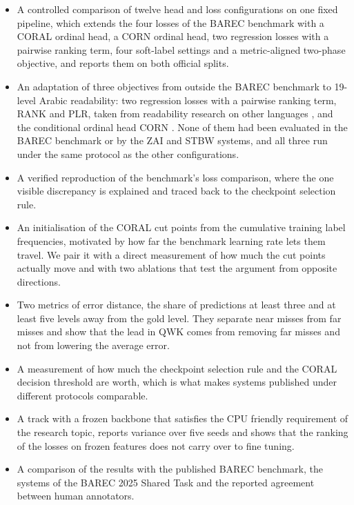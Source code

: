 \begin{itemize}

\item A controlled comparison of twelve head and loss configurations on one fixed pipeline, which extends the four losses of the BAREC benchmark with a CORAL ordinal head, a CORN ordinal head, two regression losses with a pairwise ranking term, four soft-label settings and a metric-aligned two-phase objective, and reports them on both official splits.

\item An adaptation of three objectives from outside the BAREC benchmark to 19-level Arabic readability: two regression losses with a pairwise ranking term, RANK and PLR, taken from readability research on other languages \cite{trokhymovych2024open,lee2022neural}, and the conditional ordinal head CORN \cite{shi2023deep}. None of them had been evaluated in the BAREC benchmark or by the ZAI and STBW systems, and all three run under the same protocol as the other configurations.

\item A verified reproduction of the benchmark's loss comparison, where the one visible discrepancy is explained and traced back to the checkpoint selection rule.

\item An initialisation of the CORAL cut points from the cumulative training label frequencies, motivated by how far the benchmark learning rate lets them travel. We pair it with a direct measurement of how much the cut points actually move and with two ablations that test the argument from opposite directions.
\item Two metrics of error distance, the share of predictions at least three and at least five levels away from the gold level. They separate near misses from far misses and show that the lead in QWK comes from removing far misses and not from lowering the average error.

\item A measurement of how much the checkpoint selection rule and the CORAL decision threshold are worth, which is what makes systems published under different protocols comparable.

\item A track with a frozen backbone that satisfies the CPU friendly requirement of the research topic, reports variance over five seeds and shows that the ranking of the losses on frozen features does not carry over to fine tuning.

\item A comparison of the results with the published BAREC benchmark, the systems of the BAREC 2025 Shared Task and the reported agreement between human annotators.

\end{itemize}

